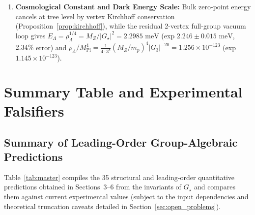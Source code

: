 \documentclass[11pt,a4paper]{article}
\theoremstyle{definition}
\theoremstyle{remark}
\newcommand{\Gthree}{G_3}
\newcommand{\Gstar}{G_\star}
\begin{document}
\begin{enumerate}
    \item \textbf{Cosmological Constant and Dark Energy Scale:} Bulk zero-point energy cancels at tree level by vertex Kirchhoff conservation (Proposition~\ref{prop:kirchhoff}), while the residual 2-vertex full-group vacuum loop gives $E_\Lambda = \rho_\Lambda^{1/4} = M_Z / |\Gstar|^2 = 2.2985\text{ meV}$ (exp $2.246 \pm 0.015\text{ meV}$, $2.34\%$ error) and $\rho_\Lambda / M_{\mathrm{Pl}}^4 = \frac{1}{4\cdot 3^8}(M_Z/m_p)^4 |\Gthree|^{-20} = 1.256 \times 10^{-123}$ (exp $1.145 \times 10^{-123}$).
\end{enumerate}

\clearpage
\section{Summary Table and Experimental Falsifiers}

\subsection{Summary of Leading-Order Group-Algebraic Predictions}

Table~\ref{tab:master} compiles the 35 structural and leading-order quantitative predictions obtained in Sections~3--6 from the invariants of $\Gstar$ and compares them against current experimental values (subject to the input dependencies and theoretical truncation caveats detailed in Section~\ref{sec:open_problems}).
\end{document}

